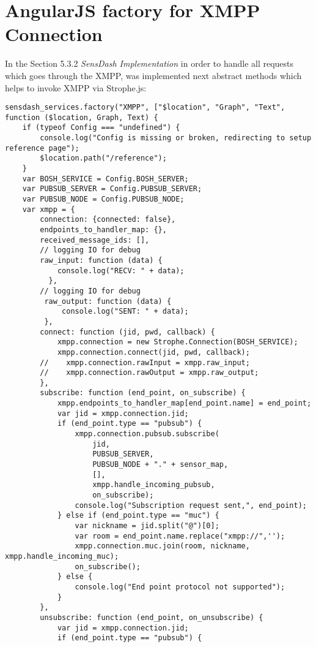 \chapter{AngularJS factory for XMPP Connection}
In the Section 5.3.2 \emph{SensDash Implementation} in order to handle all requests which goes through the XMPP, was implemented next abstract methods which helps to invoke XMPP via Strophe.js:
\begin{lstlisting}
sensdash_services.factory("XMPP", ["$location", "Graph", "Text", function ($location, Graph, Text) {
    if (typeof Config === "undefined") {
        console.log("Config is missing or broken, redirecting to setup reference page");
        $location.path("/reference");
    }
    var BOSH_SERVICE = Config.BOSH_SERVER;
    var PUBSUB_SERVER = Config.PUBSUB_SERVER;
    var PUBSUB_NODE = Config.PUBSUB_NODE;
    var xmpp = {
        connection: {connected: false},
        endpoints_to_handler_map: {},
        received_message_ids: [],
        // logging IO for debug
        raw_input: function (data) {
            console.log("RECV: " + data);
          },
        // logging IO for debug
         raw_output: function (data) {
             console.log("SENT: " + data);
         },
        connect: function (jid, pwd, callback) {
            xmpp.connection = new Strophe.Connection(BOSH_SERVICE);
            xmpp.connection.connect(jid, pwd, callback);
        //    xmpp.connection.rawInput = xmpp.raw_input;
        //    xmpp.connection.rawOutput = xmpp.raw_output;
        },
        subscribe: function (end_point, on_subscribe) {
            xmpp.endpoints_to_handler_map[end_point.name] = end_point;
            var jid = xmpp.connection.jid;
            if (end_point.type == "pubsub") {
                xmpp.connection.pubsub.subscribe(
                    jid,
                    PUBSUB_SERVER,
                    PUBSUB_NODE + "." + sensor_map,
                    [],
                    xmpp.handle_incoming_pubsub,
                    on_subscribe);
                console.log("Subscription request sent,", end_point);
            } else if (end_point.type == "muc") {
                var nickname = jid.split("@")[0];
                var room = end_point.name.replace("xmpp://",'');
                xmpp.connection.muc.join(room, nickname, xmpp.handle_incoming_muc);
                on_subscribe();
            } else {
                console.log("End point protocol not supported");
            }
        },
        unsubscribe: function (end_point, on_unsubscribe) {
            var jid = xmpp.connection.jid;
            if (end_point.type == "pubsub") {

\end{lstlisting}
